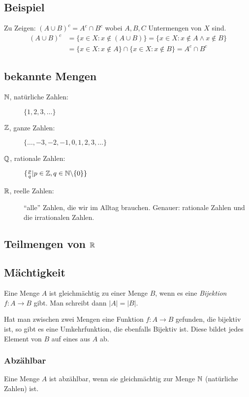 \begin{multicols}{2}
\subsection{Beispiel}
Zu Zeigen: $(A \cup B)^c = A^c \cap B^c$ wobei $A, B, C$ Untermengen von $X$ sind.
\begin{align*}
(A \cup B)^c &= \{x \in X: x \not\in (A \cup B)\} = \{x \in X: x \not\in A \land x \not\in B\}\\
&= \{x \in X: x \not\in A\} \cap \{x \in X: x \not\in B\} = A^c \cap B^c
\end{align*}

\subsection{bekannte Mengen}
\begin{description}
	\item[$\mathbb{N}$, natürliche Zahlen:] $\{1, 2, 3, \ldots\}$
	\item[$\mathbb{Z}$, ganze Zahlen:] $\{\ldots, -3, -2, -1, 0, 1, 2, 3, \ldots\}$
	\item[$\mathbb{Q}$, rationale Zahlen:] $\{\frac{p}{q} | p \in \mathbb{Z}, q \in \mathbb{N} \backslash \{0\}\}$
	\item[$\mathbb{R}$, reelle Zahlen:] ``alle'' Zahlen, die wir im Alltag brauchen. Genauer: rationale Zahlen und die irrationalen Zahlen.
\end{description}

\subsection{Teilmengen von $\mathbb{R}$}

\subsection{Mächtigkeit}
Eine Menge $A$ ist gleichmächtig zu einer Menge $B$, wenn es eine \textit{Bijektion}
$f: A \rightarrow B$ gibt. Man schreibt dann $|A| = |B|$.

Hat man zwischen zwei Mengen eine Funktion $f: A \rightarrow B$ gefunden, die bijektiv ist,
so gibt es eine Umkehrfunktion, die ebenfalls Bijektiv ist. Diese bildet jedes Element von $B$
auf eines aus $A$ ab.

\subsubsection{Abzählbar}
Eine Menge $A$ ist abzählbar, wenn sie gleichmächtig zur Menge $\mathbb{N}$ (natürliche Zahlen) ist.


\end{multicols}
